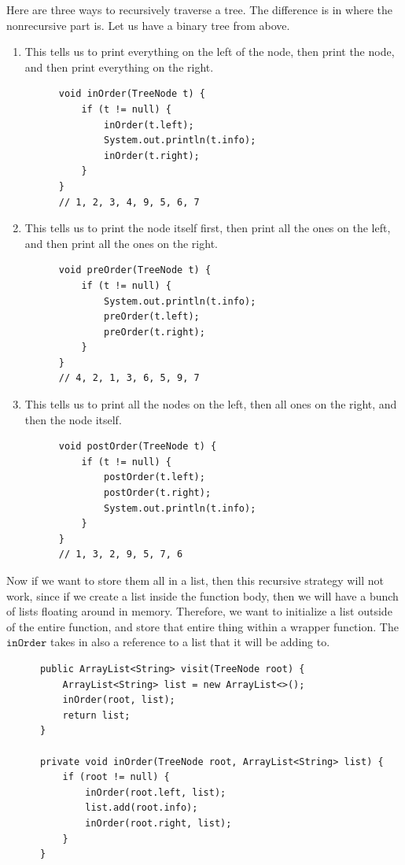   \begin{theorem}
    Here are three ways to recursively traverse a tree. The difference is in where the nonrecursive part is. Let us have a binary tree from above. 
    \begin{enumerate}
      \item This tells us to print everything on the left of the node, then print the node, and then print everything on the right. 
      \begin{lstlisting}
      void inOrder(TreeNode t) {
          if (t != null) {
              inOrder(t.left);
              System.out.println(t.info); 
              inOrder(t.right); 
          }
      }
      // 1, 2, 3, 4, 9, 5, 6, 7
      \end{lstlisting}
      
      \item This tells us to print the node itself first, then print all the ones on the left, and then print all the ones on the right. 
      \begin{lstlisting}
      void preOrder(TreeNode t) {
          if (t != null) {
              System.out.println(t.info); 
              preOrder(t.left); 
              preOrder(t.right); 
          }
      }
      // 4, 2, 1, 3, 6, 5, 9, 7
      \end{lstlisting}
      
      \item This tells us to print all the nodes on the left, then all ones on the right, and then the node itself. 
      \begin{lstlisting}
      void postOrder(TreeNode t) {
          if (t != null) {
              postOrder(t.left); 
              postOrder(t.right); 
              System.out.println(t.info); 
          }
      }
      // 1, 3, 2, 9, 5, 7, 6
      \end{lstlisting}
    \end{enumerate}
  \end{theorem}

  \begin{theorem}
    Now if we want to store them all in a list, then this recursive strategy will not work, since if we create a list inside the function body, then we will have a bunch of lists floating around in memory. Therefore, we want to initialize a list outside of the entire function, and store that entire thing within a wrapper function. The $\texttt{inOrder}$ takes in also a reference to a list that it will be adding to. 
    \begin{lstlisting}
      public ArrayList<String> visit(TreeNode root) {
          ArrayList<String> list = new ArrayList<>(); 
          inOrder(root, list); 
          return list; 
      }

      private void inOrder(TreeNode root, ArrayList<String> list) {
          if (root != null) {
              inOrder(root.left, list); 
              list.add(root.info); 
              inOrder(root.right, list); 
          }
      }
    \end{lstlisting}
  \end{theorem}

